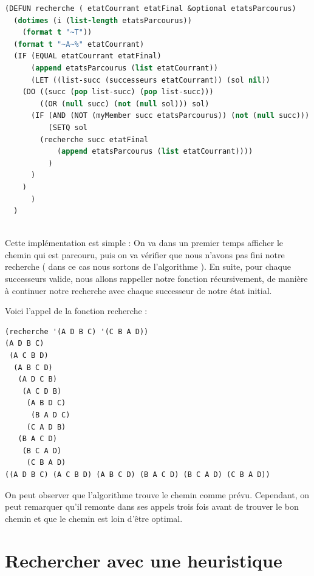 \documentclass[a4paper,10pt]{report}
\begin{document}
  \begin{lstlisting}[language=Lisp]
(DEFUN recherche ( etatCourrant etatFinal &optional etatsParcourus)   
  (dotimes (i (list-length etatsParcourus)) 
    (format t "~T"))                         
  (format t "~A~%" etatCourrant)     
  (IF (EQUAL etatCourrant etatFinal)
      (append etatsParcourus (list etatCourrant))      
      (LET ((list-succ (successeurs etatCourrant)) (sol nil))  
	(DO ((succ (pop list-succ) (pop list-succ))) 
	    ((OR (null succ) (not (null sol))) sol) 
	  (IF (AND (NOT (myMember succ etatsParcourus)) (not (null succ))) 
	      (SETQ sol 
		(recherche succ etatFinal 
		    (append etatsParcourus (list etatCourrant)))) 
	      )
	  )
	)
      )
  )
  
    \end{lstlisting}
  
  Cette implémentation est simple : On va dans un premier temps afficher le chemin qui est parcouru, puis  on va vérifier que nous n'avons pas fini notre recherche ( dans ce cas nous sortons de l'algorithme ).
  En suite, pour chaque successeurs valide, nous allons rappeller notre fonction récursivement, de manière à continuer notre recherche avec chaque successeur de notre 
  état initial.

  Voici l’appel de la fonction recherche :
  \begin{lstlisting}[language=Lisp]
(recherche '(A D B C) '(C B A D))
(A D B C)
 (A C B D)
  (A B C D)
   (A D C B)
    (A C D B)
     (A B D C)
      (B A D C)
     (C A D B)
   (B A C D)
    (B C A D)
     (C B A D)
((A D B C) (A C B D) (A B C D) (B A C D) (B C A D) (C B A D))
  \end{lstlisting}

On peut observer que l’algorithme trouve le chemin comme prévu. 
Cependant, on peut remarquer qu’il remonte dans ses appels trois fois avant de trouver le bon chemin et que le chemin est loin d'être optimal.

\chapter{Rechercher avec une heuristique}
\end{document}
